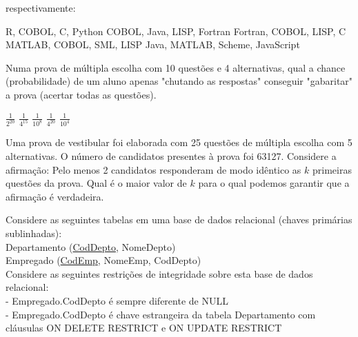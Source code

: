 \documentclass[12pt, addpoints]{exam}
\begin{document}
\begin{questions}
respectivamente:
\begin{choices}
\choice R, COBOL, C, Python
\choice COBOL, Java, LISP, Fortran
\choice Fortran, COBOL, LISP, C
\choice MATLAB, COBOL, SML, LISP
\choice Java, MATLAB, Scheme, JavaScript
\end{choices}

\question

Numa prova de múltipla escolha com 10 questões e 4 alternativas, qual a chance (probabilidade) de um aluno apenas "chutando as respostas" conseguir "gabaritar" a prova (acertar todas as questões).


\begin{choices}
\choice \( \frac{1}{2^{20}} \)
\choice \( \frac{1}{4^{15}} \)
\choice \( \frac{1}{10^{8}} \)
\choice \( \frac{1}{4^{20}} \)
\choice \( \frac{1}{10^{4}} \)
\end{choices}

\question

Uma prova de vestibular foi elaborada com 25 questões de múltipla escolha com 5 alternativas. O número de candidatos presentes à prova foi 63127. Considere a afirmação: Pelo menos 2 candidatos responderam de modo idêntico as \( k \) primeiras questões da prova. Qual é o maior valor de \( k \) para o qual podemos garantir que a afirmação é verdadeira.


\begin{choices}
\end{choices}

\question

Considere as seguintes tabelas em uma base de dados relacional (chaves primárias sublinhadas):\\

Departamento (\underline{CodDepto}, NomeDepto)\\

Empregado (\underline{CodEmp}, NomeEmp, CodDepto)\\

Considere as seguintes restrições de integridade sobre esta base de dados relacional:\\

- Empregado.CodDepto é sempre diferente de NULL\\

- Empregado.CodDepto é chave estrangeira da tabela Departamento com cláusulas ON DELETE RESTRICT e ON UPDATE RESTRICT\\


\end{questions}
\end{document}
